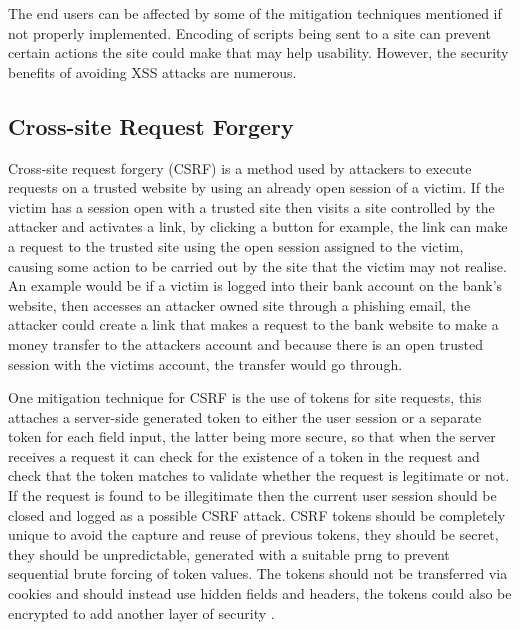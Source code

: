 \documentclass{ueacmpstyle}
\begin{document}
      The end users can be affected by some of the mitigation techniques mentioned if not 
      properly implemented. Encoding of scripts being sent to a site can prevent certain 
      actions the site could make that may help usability. However, the security benefits 
      of avoiding XSS attacks are numerous.

      \subsection{Cross-site Request Forgery}\label{sub:CSRF}
      Cross-site request forgery (CSRF) is a method used by attackers to execute requests on 
      a trusted website by using an already open session of a victim. If the victim has a 
      session open with a trusted site then visits a site controlled by the attacker and 
      activates a link, by clicking a button for example, the link can make a request to 
      the trusted site using the open session assigned to the victim, causing some action to be 
      carried out by the site that the victim may not realise. An example would be if a 
      victim is logged into their bank account on the bank's website, then accesses an attacker 
      owned site through a phishing email, the attacker could create a link that makes a request
      to the bank website to make a money transfer to the attackers account and because there 
      is an open trusted session with the victims account, the transfer would go through.
      
      One mitigation technique for CSRF is the use of tokens for site requests, this attaches 
      a server-side generated token to either the user session or a separate token for each 
      field input, the latter being more secure, so that when the server receives a request 
      it can check for the existence of a token in the request and check that the token matches 
      to validate whether the request is legitimate or not. If the request is found to be 
      illegitimate then the current user session should be closed and logged as a possible 
      CSRF attack. CSRF tokens should be completely unique to avoid the capture and reuse of 
      previous tokens, they should be secret, they should be unpredictable, generated with 
      a suitable prng to prevent sequential brute forcing of token values. The tokens should 
      not be transferred via cookies and should instead use hidden fields and headers, the 
      tokens could also be encrypted to add another layer of security \citep{OWASPCSRFPrevention}.
\end{document}
